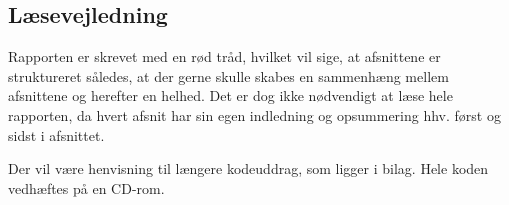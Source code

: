 \subsection{Læsevejledning}
Rapporten er skrevet med en rød tråd, hvilket vil sige, at afsnittene er struktureret således, at der gerne skulle skabes en sammenhæng mellem afsnittene og herefter en helhed. Det er dog ikke nødvendigt at læse hele rapporten, da hvert afsnit har sin egen indledning og opsummering hhv. først og sidst i afsnittet.

Der vil være henvisning til længere kodeuddrag, som ligger i bilag. Hele koden vedhæftes på en CD-rom.




